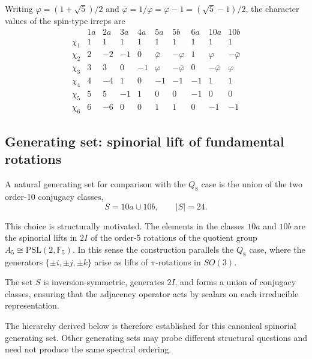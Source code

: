 \documentclass[11pt,a4paper]{article}
\begin{document}
    Writing $\varphi = (1+\sqrt{5})/2$ and
    $\bar\varphi = 1/\varphi = \varphi - 1 = (\sqrt{5}-1)/2$, the character
    values of the spin-type irreps are
    \begin{equation}
      \renewcommand{\arraystretch}{1.3}
      \begin{array}{l|rrrrrrrrr}
        & 1a & 2a & 3a & 4a & 5a & 5b & 6a & 10a & 10b \\
        \hline
        \chi_1 & 1 &  1 &  1 &  1 &  1 &  1 &  1 &  1 &  1 \\
        \chi_2 & 2 & -2 & -1 &  0 & \bar\varphi & -\varphi & 1 & \varphi & -\bar\varphi \\
        \chi_3 & 3 &  3 &  0 & -1 & \varphi & -\bar\varphi & 0 & -\bar\varphi & \varphi \\
        \chi_4 & 4 & -4 &  1 &  0 & -1 & -1 & -1 & 1 & 1 \\
        \chi_5 & 5 &  5 & -1 &  1 &  0 &  0 & -1 & 0 & 0 \\
        \chi_6 & 6 & -6 &  0 &  0 &  1 &  1 &  0 & -1 & -1
      \end{array}
      \label{eq:CT-2I}
    \end{equation}

  \subsection{Generating set: spinorial lift of fundamental rotations}
    \label{sec:step5-genset}

    A natural generating set for comparison with the $Q_8$ case is the union of
    the two order-10 conjugacy classes,
    \begin{equation}
      S = 10a \cup 10b,
      \qquad
      |S| = 24.
      \label{eq:S-2I}
    \end{equation}

    This choice is structurally motivated.
    The elements in the classes $10a$ and $10b$ are the spinorial lifts in $2I$
    of the order-5 rotations of the quotient group
    $A_5 \cong \mathrm{PSL}(2,\mathbb{F}_5)$.
    In this sense the construction parallels the $Q_8$ case, where the generators
    $\{\pm i,\pm j,\pm k\}$ arise as lifts of $\pi$-rotations in $SO(3)$.

    The set $S$ is inversion-symmetric, generates $2I$, and forms a union of
    conjugacy classes, ensuring that the adjacency operator acts by scalars
    on each irreducible representation.

    The hierarchy derived below is therefore established for this canonical
    spinorial generating set.
    Other generating sets may probe different structural questions and need
    not produce the same spectral ordering.
\end{document}
